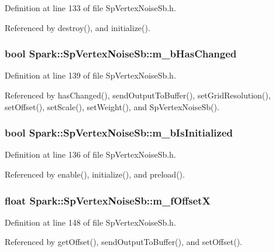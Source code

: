Definition at line 133 of file Sp\-Vertex\-Noise\-Sb.h.

Referenced by destroy(), and initialize().
\subsubsection{\setlength{\rightskip}{0pt plus 5cm}bool {\bf Spark::Sp\-Vertex\-Noise\-Sb::m\_\-b\-Has\-Changed}\hspace{0.3cm}{\tt  [protected]}}\label{classSpark_1_1SpVertexNoiseSb_p5}


Definition at line 139 of file Sp\-Vertex\-Noise\-Sb.h.

Referenced by has\-Changed(), send\-Output\-To\-Buffer(), set\-Grid\-Resolution(), set\-Offset(), set\-Scale(), set\-Weight(), and Sp\-Vertex\-Noise\-Sb().
\subsubsection{\setlength{\rightskip}{0pt plus 5cm}bool {\bf Spark::Sp\-Vertex\-Noise\-Sb::m\_\-b\-Is\-Initialized}\hspace{0.3cm}{\tt  [protected]}}\label{classSpark_1_1SpVertexNoiseSb_p4}


Definition at line 136 of file Sp\-Vertex\-Noise\-Sb.h.

Referenced by enable(), initialize(), and preload().
\subsubsection{\setlength{\rightskip}{0pt plus 5cm}float {\bf Spark::Sp\-Vertex\-Noise\-Sb::m\_\-f\-Offset\-X}\hspace{0.3cm}{\tt  [protected]}}\label{classSpark_1_1SpVertexNoiseSb_p8}


Definition at line 148 of file Sp\-Vertex\-Noise\-Sb.h.

Referenced by get\-Offset(), send\-Output\-To\-Buffer(), and set\-Offset().
